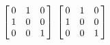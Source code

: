 {$\left[\hskip -3pt \begin{array}{ccc} 0&1&0\\  1&0&0
\\  0&0&1\end{array}\hskip -3pt \right]$ 
}
{$ \left[\hskip -3pt \begin{array}{ccc} 0&1&0\\  1&0&0
\\  0&0&1\end{array}\hskip -3pt \right]$}
